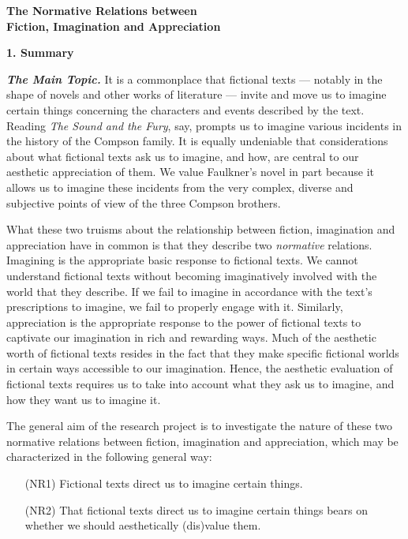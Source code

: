 \begin{center}
\noindent\textbf{\large The Normative Relations between\\ Fiction, Imagination and
Appreciation}
\end{center}


\noindent\textbf{\large 1. Summary}
\vspace{.1cm}

\noindent \textbf{\emph{The Main Topic.}} It is a commonplace that fictional texts --- notably in the shape of novels and other works of literature --- invite and move us to imagine certain things concerning the characters and events described by the text. Reading \emph{The Sound and the Fury}, say, prompts us to imagine various incidents in the history of the Compson family. It is equally undeniable that considerations about what fictional texts ask us to imagine, and how, are central to our aesthetic appreciation of them. We value Faulkner's novel in part because it allows us to imagine these incidents from the very complex, diverse and subjective points of view of the three Compson brothers.

What these two truisms about the relationship between fiction, imagination and appreciation have in common is that they describe two \emph{normative} relations. Imagining is the appropriate basic response to fictional texts. We cannot understand fictional texts without becoming imaginatively involved with the world that they describe. If we fail to imagine in accordance with the text's prescriptions to imagine, we fail to properly engage with it. Similarly, appreciation is the appropriate response to the power of fictional texts to captivate our imagination in rich and rewarding ways. Much of the aesthetic worth of fictional texts resides in the fact that they make specific fictional worlds in certain ways accessible to our imagination. Hence, the aesthetic evaluation of fictional texts requires us to take into account what they ask us to imagine, and how they want us to imagine it.

The general aim of the research project is to investigate the nature of these two normative relations between fiction, imagination and appreciation, which may be characterized in the following general way:


\vspace{-.1cm}
\begin{itemize}[leftmargin=2cm]
\item[{(NR1)}] Fictional texts direct us to imagine certain things.
\vspace{-.2cm}
\item[{(NR2)}] That fictional texts direct us to imagine certain things bears on whether we should aesthetically (dis)value them. 
\end{itemize}
\vspace{-.1cm}


